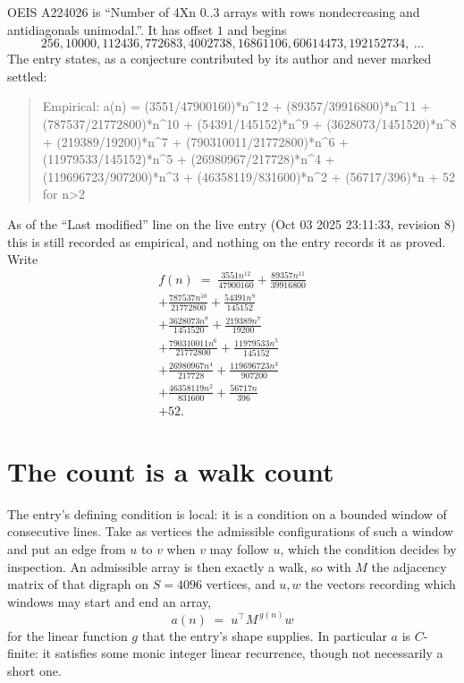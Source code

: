 \documentclass[11pt,a4paper]{article}
\theoremstyle{plain}
\theoremstyle{definition}
\begin{document}
OEIS A224026 is ``Number of 4Xn 0..3 arrays with rows nondecreasing and antidiagonals unimodal.''. It has offset $1$ and begins
\[
256, 10000, 112436, 772683, 4002738, 16861106, 60614473, 192152734,\ \dots
\]
The entry states, as a conjecture contributed by its author and never marked settled:
\begin{quote}
Empirical: a(n) = (3551/47900160)*n\^{}12 + (89357/39916800)*n\^{}11 + (787537/21772800)*n\^{}10 + (54391/145152)*n\^{}9 + (3628073/1451520)*n\^{}8 + (219389/19200)*n\^{}7 + (790310011/21772800)*n\^{}6 + (11979533/145152)*n\^{}5 + (26980967/217728)*n\^{}4 + (119696723/907200)*n\^{}3 + (46358119/831600)*n\^{}2 + (56717/396)*n + 52 for n>2
\end{quote}
As of the ``Last modified'' line on the live entry (Oct 03 2025 23:11:33, revision 8) this is still
recorded as empirical, and nothing on the entry records it as proved. Write
\begin{multline*}
f(n)\;=\;\frac{3551 n^{12}}{47900160} + \frac{89357 n^{11}}{39916800} \\
+ \frac{787537 n^{10}}{21772800} + \frac{54391 n^{9}}{145152} \\
+ \frac{3628073 n^{8}}{1451520} + \frac{219389 n^{7}}{19200} \\
+ \frac{790310011 n^{6}}{21772800} + \frac{11979533 n^{5}}{145152} \\
+ \frac{26980967 n^{4}}{217728} + \frac{119696723 n^{3}}{907200} \\
+ \frac{46358119 n^{2}}{831600} + \frac{56717 n}{396} \\
+ 52.
\end{multline*}

\section{The count is a walk count}

The entry's defining condition is local: it is a condition on a bounded window of consecutive lines. Take as vertices the
admissible configurations of such a window and put an edge from $u$ to $v$ when $v$ may
follow $u$, which the condition decides by inspection. An admissible array is then exactly a
walk, so with $M$ the adjacency matrix of that digraph on $S=4096$ vertices, and $u,w$ the
vectors recording which windows may start and end an array,
\[
a(n)\;=\;u^{\!\top}M^{\,g(n)}w
\]
for the linear function $g$ that the entry's shape supplies. In particular $a$ is
$C$-finite: it satisfies some monic integer linear recurrence, though not necessarily a short
one.
\end{document}

